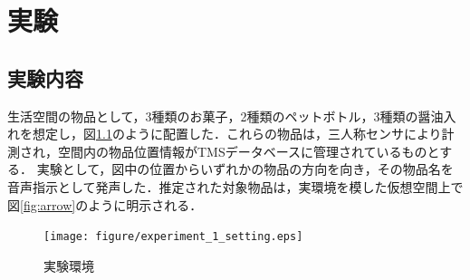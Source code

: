 \chapter{実験}
\section{実験内容}
生活空間の物品として，3種類のお菓子，2種類のペットボトル，3種類の醤油入れを想定し，図{\ref{fig:experiment_1_setting}}のように配置した．これらの物品は，三人称センサにより計測され，空間内の物品位置情報がTMSデータベースに管理されているものとする．
実験として，図中の位置からいずれかの物品の方向を向き，その物品名を音声指示として発声した．推定された対象物品は，実環境を模した仮想空間上で図{\ref{fig:arrow}}のように明示される．
%
\begin{figure}[htbp]
  \begin{center}
   \texttt{[image: figure/experiment\_1\_setting.eps]}
   \caption{実験環境}
   \label{fig:experiment_1_setting}
  \end{center}
\end{figure}
%
